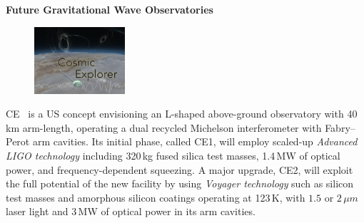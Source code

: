 \begin{DetBox}{\bf Future Gravitational Wave Observatories}
\begin{tcolorbox}[standard jigsaw,colframe=antiquefuchsia!80!black,colback=antiquefuchsia!20!white,opacityback=0.6,coltext=black,size=small, title=Cosmic Explorer (CE)] 
\begin{figure}
\vspace{-10pt}
\includegraphics*[width=0.3\textwidth]{Figures/CE_Thumb.jpg}
\label{fig:CE_Thumb}
\vspace{-20pt}
\end{figure}
CE~\cite{CosmicExplorer2017} is a US concept envisioning an L-shaped above-ground observatory with 40\,km arm-length, operating a dual recycled Michelson interferometer with Fabry--Perot arm cavities. 
Its initial phase, called CE1, will employ scaled-up \emph{Advanced LIGO technology} including 320\,kg fused silica test masses, 1.4\,MW of optical power, and frequency-dependent squeezing. 
A major upgrade, CE2, will exploit the full potential of the new facility by using \emph{Voyager technology} such as silicon test masses and amorphous silicon coatings operating at 123\,K, with $1.5$ or $2\,\mu m$ laser light and 3\,MW of optical power in its arm cavities.



\end{tcolorbox}




\begin{tcolorbox}[standard jigsaw,colframe=azure!70!black,colback=azure!20!white,opacityback=0.6,coltext=black, size=small, title= LIGO Voyager]


\end{tcolorbox}
\end{DetBox}
